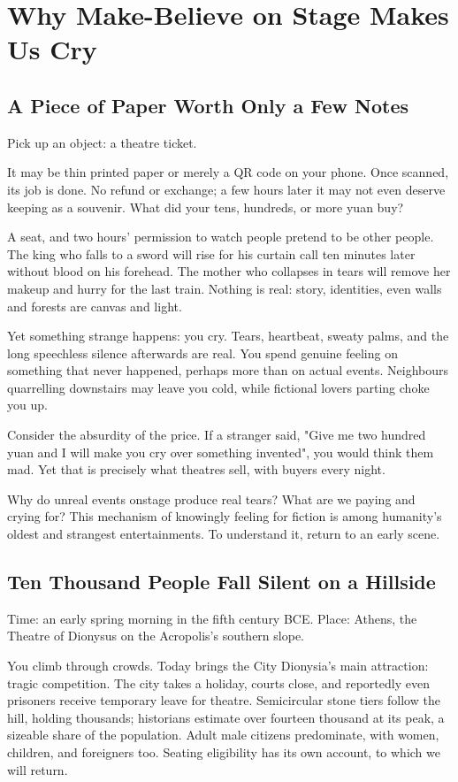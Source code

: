 \chapter[Why Theatre Makes Us Cry]{Why Make-Believe on Stage Makes Us Cry}
\section{A Piece of Paper Worth Only a Few Notes}
Pick up an object: a theatre ticket.

It may be thin printed paper or merely a QR code on your phone. Once scanned, its job is done. No refund or exchange; a few hours later it may not even deserve keeping as a souvenir. What did your tens, hundreds, or more yuan buy?

A seat, and two hours' permission to watch people pretend to be other people. The king who falls to a sword will rise for his curtain call ten minutes later without blood on his forehead. The mother who collapses in tears will remove her makeup and hurry for the last train. Nothing is real: story, identities, even walls and forests are canvas and light.

Yet something strange happens: you cry. Tears, heartbeat, sweaty palms, and the long speechless silence afterwards are real. You spend genuine feeling on something that never happened, perhaps more than on actual events. Neighbours quarrelling downstairs may leave you cold, while fictional lovers parting choke you up.

Consider the absurdity of the price. If a stranger said, "Give me two hundred yuan and I will make you cry over something invented", you would think them mad. Yet that is precisely what theatres sell, with buyers every night.

Why do unreal events onstage produce real tears? What are we paying and crying for? This mechanism of knowingly feeling for fiction is among humanity's oldest and strangest entertainments. To understand it, return to an early scene.

\section[Ten Thousand Fall Silent]{Ten Thousand People Fall Silent on a Hillside}
Time: an early spring morning in the fifth century BCE. Place: Athens, the Theatre of Dionysus on the Acropolis's southern slope.

You climb through crowds. Today brings the City Dionysia's main attraction: tragic competition. The city takes a holiday, courts close, and reportedly even prisoners receive temporary leave for theatre. Semicircular stone tiers follow the hill, holding thousands; historians estimate over fourteen thousand at its peak, a sizeable share of the population. Adult male citizens predominate, with women, children, and foreigners too. Seating eligibility has its own account, to which we will return.

